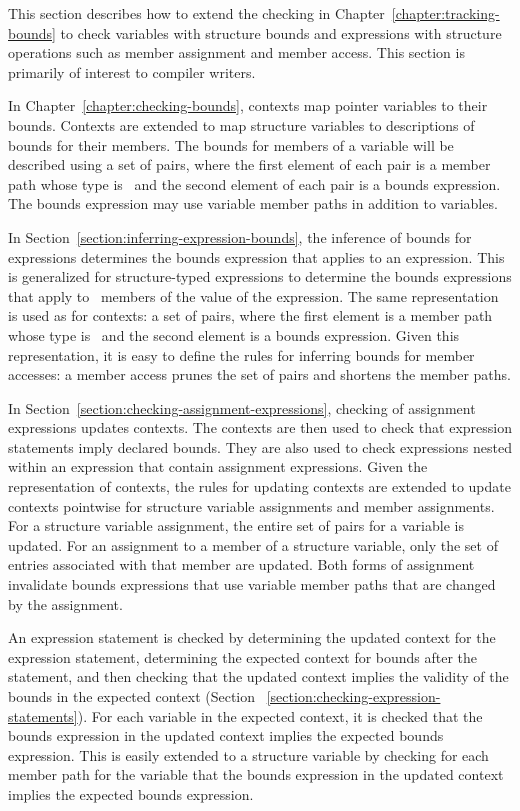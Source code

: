 This section describes how to extend the checking in Chapter~\ref{chapter:tracking-bounds} 
to check variables with structure bounds and expressions with structure operations such 
as member assignment and member access.  This section is primarily of interest to compiler writers.

In Chapter~\ref{chapter:checking-bounds}, contexts map pointer variables to their bounds.
Contexts are extended to map structure variables to descriptions of bounds for their
members.  The bounds for members of a variable will be described using a set of pairs,
where the first element of each pair is a member path whose type is \arrayptr\
and the second element of each pair is a bounds expression.  The bounds expression may use 
variable member paths in addition to variables.

In Section~\ref{section:inferring-expression-bounds}, the inference of bounds for expressions
determines the bounds expression that applies to an expression.   This is generalized for
structure-typed expressions to determine the bounds expressions that apply to \arrayptr\ members
of the value of the expression. 
The same representation is used as for contexts: a
set of pairs, where the first element is a member path whose type is \arrayptr\
and the second element is a bounds expression.  Given this representation, it is easy to define
the rules for inferring bounds for member accesses: a member access prunes the
set of pairs and shortens the member paths.

In Section~\ref{section:checking-assignment-expressions}, checking of assignment
expressions updates contexts.  The contexts are then used to check that expression
statements imply declared bounds.  They are also used to check expressions nested
within an expression that contain assignment expressions. 
Given the representation of contexts, the rules for updating contexts
are extended to update contexts pointwise for structure variable assignments and member 
assignments.  For a structure variable assignment, the entire set of pairs for a
variable is updated.  For an assignment to a member of a  structure variable,
only the set of entries  associated with that member are updated.  Both forms of assignment
invalidate bounds expressions that use variable member paths that are changed by the
assignment.

An expression statement is checked by determining the updated context for the
expression statement, determining the expected context for bounds after 
the statement, and then checking that the updated context implies the
validity of the bounds in the expected context (Section ~\ref{section:checking-expression-statements}).
For each variable in the expected context, it is checked that the bounds expression in
the updated context implies the expected bounds expression.  This is easily 
extended to a structure variable by checking for each member path for 
the variable that the bounds expression in the updated context implies
the expected bounds expression.

